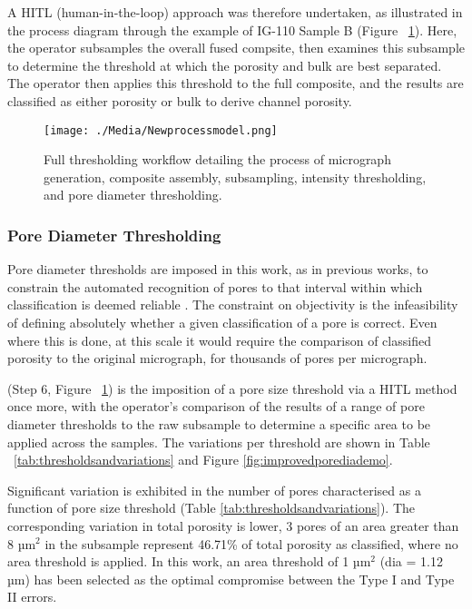 \documentclass[3p,twocolumn]{elsarticle}
\begin{document}
	A HITL (human-in-the-loop) approach was therefore undertaken, as illustrated
	in the  process diagram through the example of IG-110 Sample B (Figure
	~\ref{fig:Final Workflow}). Here, the operator subsamples the overall fused
	compsite, then examines this subsample to determine the threshold at which
	the porosity and bulk are best separated. The operator then applies this
	threshold to the full composite, and the results are classified as either
	porosity or bulk to derive channel porosity.
	
\begin{figure}[!htbp]
    \centering
    \texttt{[image: ./Media/Newprocessmodel.png]}
    \caption{Full thresholding workflow detailing the process of micrograph generation,
     composite assembly, subsampling, intensity thresholding, and pore diameter thresholding.}
    \label{fig:Final Workflow}
\end{figure}

	\subsubsection{Pore Diameter Thresholding}
    
   Pore diameter thresholds are imposed in this work, as in previous works, to
   constrain the automated recognition of pores to that interval within which
   classification is deemed reliable \citep{Taylor2016, Huang2019, Kane2011a}.
   The constraint on objectivity is the infeasibility of defining absolutely
   whether a given classification of a pore is correct. Even where this is done,
   at this scale it would require the comparison of classified porosity to the
   original micrograph, for thousands of pores per micrograph. 

    (Step 6, Figure ~\ref{fig:Final Workflow})  is the imposition of a pore size
      threshold via a HITL method once more, with the operator's comparison of
      the results of a range of pore diameter thresholds to the raw subsample to
      determine a specific area to be applied across the samples. The variations
      per threshold are shown in Table ~\ref{tab:thresholdsandvariations} and
      Figure \ref{fig:improvedporediademo}.
      
      Significant variation is exhibited in the number of pores characterised as
      a function of pore size threshold (Table
      \ref{tab:thresholdsandvariations}). The corresponding variation in total
      porosity is lower, 3 pores of an area greater than 8 µm\(^2\)
      in the subsample represent 46.71\% of total porosity as classified, where
      no area threshold is applied. In this work, an area threshold of 1
      µm\(^2\) (dia = 1.12 µm) has been selected as the optimal compromise between the Type I
      and Type II errors.
\end{document}
